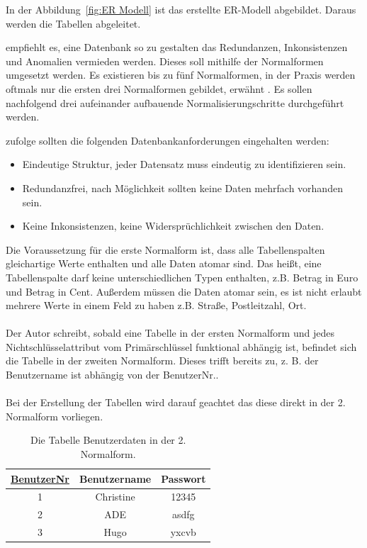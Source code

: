 In der Abbildung~\ref{fig:ER Modell} ist das erstellte ER-Modell abgebildet. Daraus werden die Tabellen abgeleitet. 

\cite{DBREdun} empfiehlt es, eine Datenbank so zu gestalten das \glqq Redundanzen, Inkonsistenzen und Anomalien\grqq{} vermieden werden. 
Dieses soll mithilfe der Normalformen umgesetzt werden.
Es existieren bis zu fünf Normalformen, in der Praxis werden oftmals nur die ersten drei Normalformen gebildet, erwähnt \cite{DB2}.
Es sollen nachfolgend drei aufeinander aufbauende Normalisierungschritte durchgeführt werden.

\cite{relaDatenbank} zufolge sollten die folgenden Datenbankanforderungen eingehalten werden:

\begin{itemize}
	\itemsep0pt
	\item Eindeutige Struktur, jeder Datensatz muss eindeutig zu identifizieren sein.
	\item Redundanzfrei, nach Möglichkeit sollten keine Daten mehrfach vorhanden sein.
	\item Keine Inkonsistenzen, keine Widersprüchlichkeit zwischen den Daten.
\end{itemize} 


Die Voraussetzung für die erste Normalform ist, dass alle Tabellenspalten gleichartige Werte enthalten und alle Daten atomar sind.
Das heißt, eine Tabellenspalte darf keine unterschiedlichen Typen enthalten, z.B. Betrag in Euro und Betrag in Cent. 
Außerdem müssen die Daten atomar sein, es ist nicht erlaubt mehrere Werte in einem Feld zu haben z.B. Straße, Postleitzahl, Ort.
\\
\\
Der Autor \cite{DB2} schreibt, sobald eine Tabelle in der ersten Normalform und jedes Nichtschlüsselattribut vom Primärschlüssel funktional abhängig ist, befindet sich die Tabelle in der zweiten Normalform. Dieses trifft bereits zu, z. B. der Benutzername ist abhängig von der BenutzerNr..
\\
\\
Bei der Erstellung der Tabellen wird darauf geachtet das diese direkt in der 2. Normalform vorliegen. 

\begin{table}[H]
	\centering
	\begin{tabular}{|c|c|c|}
		\hline
		\underline{BenutzerNr} & Benutzername & Passwort \\
		\hline
		1 & Christine &  12345\\
		\hline
		2 & ADE &  asdfg\\
		\hline
		3 & Hugo &  yxcvb\\
		\hline
	\end{tabular}
	\caption{Die Tabelle Benutzerdaten in der 2. Normalform.}
	\label{tab: Benutzerdaten 2.NF}
\end{table}


